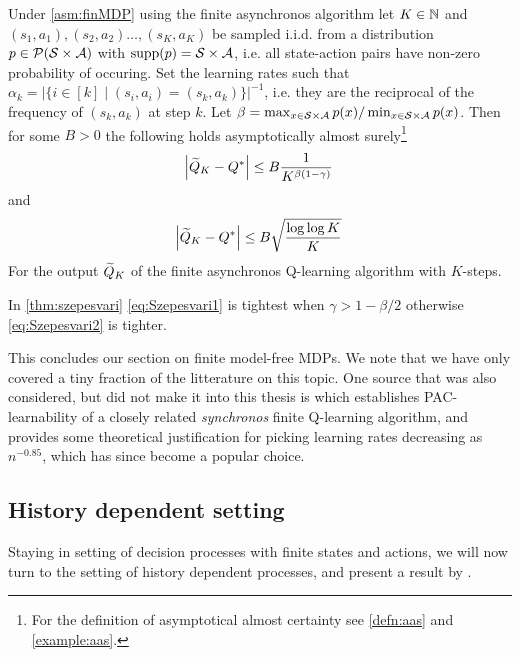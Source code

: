 \begin{thm}[Szepesvári]
  Under \cref{asm:finMDP} using the finite asynchronos algorithm
  let $K \in \mathbb{N}$ and
  $(s_1, a_1), (s_2, a_2) \dots, (s_K, a_K)$ be sampled i.i.d. from
  a distribution
  $p \in \mathcal{P}(\mathcal{S} \times \mathcal{A})$ with $\text{supp}(p) = \mathcal{S} \times \mathcal{A}$,
  i.e. all state-action pairs have non-zero probability of occuring.
  Set the learning rates such that
  $\alpha_k
  = |\{ i \in [k] \mid (s_i, a_i) = (s_k, a_k) \}|^{-1}$,
  i.e. they are the reciprocal of the frequency of $(s_k, a_k)$ at step $k$.
  Let $\beta = \max_{x \in \mathcal{S} \times \mathcal{A}} p(x) /
  \min_{x \in \mathcal{S} \times \mathcal{A}} p(x)$.
  Then for some $B > 0$ the following holds asymptotically almost
  surely\footnote{For the definition of
  asymptotical almost certainty see \cref{defn:aas} and \cref{example:aas}.}
  \begin{equation}
    \abs{\widetilde{Q}_K - Q^*} \leq B \frac{1}{K^{\beta (1-\gamma)}}
    \label{eq:Szepesvari1}
  \end{equation}
  and
  \begin{equation}
    \abs{\widetilde{Q}_K - Q^*} \leq B \sqrt{\frac{\log \log K}{K}}
    \label{eq:Szepesvari2}
  \end{equation}
  For the output $\widetilde{Q}_K$ of the finite asynchronos Q-learning algorithm
  with $K$-steps.
  \label{thm:szepesvari}
\end{thm}

\begin{rem}
  In \cref{thm:szepesvari} 
  \cref{eq:Szepesvari1} is tightest when $\gamma > 1 - \beta/2$
  otherwise \cref{eq:Szepesvari2} is tighter.
\end{rem}

This concludes our section on finite model-free MDPs.
We note that we have only covered a tiny fraction of the litterature on this
topic.
One source that was also considered, but did not make it into this thesis
is  which establishes PAC-learnability of a closely related
\emph{synchronos} finite Q-learning algorithm,
and provides some theoretical justification for picking learning rates
decreasing as $n^{-0.85}$, which has since become a popular choice.

\subsection{History dependent setting}

Staying in setting of decision processes with finite states and actions,
we will now turn to the setting of history dependent processes,
and present a result by .

